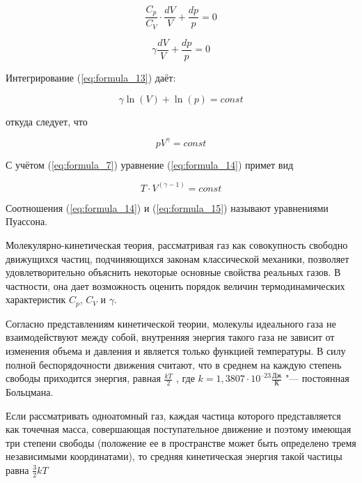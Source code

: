 \begin{equation*}
    \frac{C_p}{C_V} \cdot \frac{d V}{V} + \frac{d p}{p} = 0
\end{equation*}

\begin{equation}
    \gamma \frac{d V}{V} + \frac{d p}{p} = 0
    \label{eq:formula_13}
\end{equation}

Интегрирование (\ref{eq:formula_13}) даёт:

\begin{equation*}
    \gamma \ln(V) + \ln(p) = const
\end{equation*}

откуда следует, что

\begin{equation}
    p V^ \gamma = const
    \label{eq:formula_14}
\end{equation}

С учётом (\ref{eq:formula_7}) уравнение (\ref{eq:formula_14}) примет вид

\begin{equation}
    T \cdot V^(\gamma - 1) = const
    \label{eq:formula_15}
\end{equation}

Соотношения (\ref{eq:formula_14}) и (\ref{eq:formula_15}) называют уравнениями Пуассона.

Молекулярно-кинетическая теория, рассматривая газ как совокупность свободно движущихся частиц, подчиняющихся законам классической механики, позволяет удовлетворительно объяснить некоторые основные свойства реальных газов. В частности, она дает возможность оценить порядок величин термодинамических характеристик $C_p$, $C_V$ и $\gamma$.

Согласно представлениям кинетической теории, молекулы идеального газа не взаимодействуют между собой, внутренняя энергия такого газа не зависит от изменения объема и давления и является только функцией температуры. В силу полной беспорядочности движения считают, что в среднем на каждую степень свободы приходится энергия, равная $\frac{kT}{2}$ , где $k = 1,3807 \cdot 10^{–23} \frac{\text{Дж}}{\text{К}}$ "--- постоянная Больцмана.

Если рассматривать одноатомный газ, каждая частица которого представляется как точечная масса, совершающая поступательное движение и поэтому имеющая три степени свободы (положение ее в пространстве может быть определено тремя независимыми координатами), то средняя кинетическая энергия такой частицы равна $\frac{3}{2}kT$


